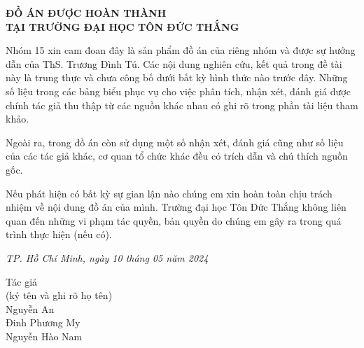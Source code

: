 \documentclass[12pt, a4paper]{article}
\begin{document}
	\newpage
	\begin{center}
		\textbf{\Large ĐỒ ÁN ĐƯỢC HOÀN THÀNH\\TẠI TRƯỜNG ĐẠI HỌC TÔN ĐỨC THẮNG}\\ [15pt]
	\end{center}
	\par 
	\large 
	\hspace{0.75cm}Nhóm 15 xin cam đoan đây là sản phẩm đồ án của riêng nhóm và được sự hướng dẫn của ThS. Trương Đình Tú. Các nội dung nghiên cứu, kết quả trong đề tài này là trung thực và chưa công bố dưới bất kỳ hình thức nào trước đây. Những số liệu trong các bảng biểu phục vụ cho việc phân tích, nhận xét, đánh giá được chính tác giả thu thập từ các nguồn khác nhau có ghi rõ trong phần tài liệu tham khảo.\par
	\hspace{0.75cm}Ngoài ra, trong đồ án còn sử dụng một số nhận xét, đánh giá cũng như số liệu của các tác giả khác, cơ quan tổ chức khác đều có trích dẫn và chú thích nguồn gốc.\par
	\hspace{0.75cm}Nếu phát hiện có bất kỳ sự gian lận nào chúng em xin hoàn toàn chịu trách nhiệm về nội dung đồ án của mình. Trường đại học Tôn Đức Thắng không liên quan đến những vi phạm tác quyền, bản quyền do chúng em gây ra trong quá trình thực hiện (nếu có).
	\begin{flushright}
		{\large \textit{TP. Hồ Chí Minh, ngày 10 tháng 05  năm 2024}} \\		
		\begin{adjustwidth}{9cm}{1cm}
			\begin{center}		
				{\large {Tác giả\\
						(ký tên và ghi rõ họ tên)\\
						Nguyễn An\\
						Đinh Phương My\\
						Nguyễn Hào Nam \\
				}} 
			\end{center}
		\end{adjustwidth}
	\end{flushright}					
	
\end{document}
